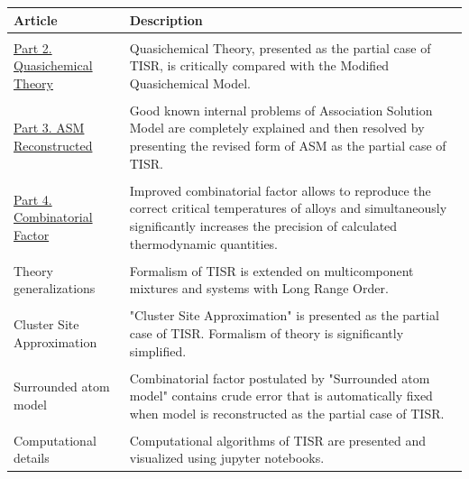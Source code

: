 \documentclass[12pt,abstract]{scrartcl}
\begin{document}
\begin{center}
 \begin{tabular}{p{60mm} p{90mm}} 
Article & Description \\ 
 \hline
 \hline
&\\
\href{https://osf.io/4hzf9/} {Part 2. Quasichemical Theory} &  Quasichemical Theory, presented as the partial case of  TISR,   is   critically compared with the Modified Quasichemical Model. \\
 & \\
\href{https://osf.io/7x2e4/}{Part 3. ASM Reconstructed} &Good known internal problems of Association Solution Model are completely explained and then resolved by presenting the revised form of ASM as the partial case of TISR.\\
& \\
\href{https://osf.io/zmwcv/}{Part 4. Combinatorial Factor}
& Improved combinatorial factor allows to reproduce the correct critical temperatures of alloys and simultaneously  significantly increases the precision of calculated thermodynamic quantities.\\
& \\
Theory generalizations&Formalism of TISR is extended on multicomponent mixtures and systems with Long Range Order.\\
&\\
Cluster Site Approximation & "Cluster Site Approximation" is presented as the partial case of TISR. Formalism of theory is significantly simplified.\\
&\\
Surrounded atom model & Combinatorial factor postulated by "Surrounded atom model" contains crude error that is automatically fixed  when model is reconstructed as the partial case of TISR. \\
&\\
Computational details& Computational algorithms of TISR are presented and visualized  using jupyter notebooks.
\end{tabular}
\end{center}







\end{document}
